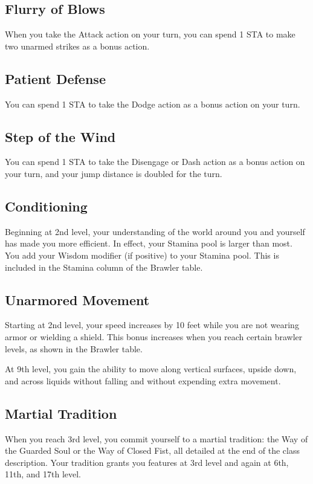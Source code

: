 \subsection{Flurry of Blows}

When you take the Attack action on your turn, you can spend 1 STA to make two unarmed strikes as a bonus action.

\subsection{Patient Defense}

You can spend 1 STA to take the Dodge action as a bonus action on your turn.

\subsection{Step of the Wind}

You can spend 1 STA to take the Disengage or Dash action as a bonus action on your turn, and your jump distance is doubled for the turn.

\subsection{Conditioning}
Beginning at 2nd level, your understanding of the world around you and yourself has made you more efficient. In effect, your Stamina pool is larger than most. You add your Wisdom modifier (if positive) to your Stamina pool. This is included in the Stamina column of the Brawler table. 

\subsection{Unarmored Movement}

Starting at 2nd level, your speed increases by 10 feet while you are not wearing armor or wielding a shield. This bonus increases when you reach certain brawler levels, as shown in the Brawler table.

At 9th level, you gain the ability to move along vertical surfaces, upside down, and across liquids without falling and without expending extra movement.

\subsection{Martial Tradition}

When you reach 3rd level, you commit yourself to a martial tradition: the Way of the Guarded Soul or the Way of Closed Fist, all detailed at the end of the class description. Your tradition grants you features at 3rd level and again at 6th, 11th, and 17th level.

